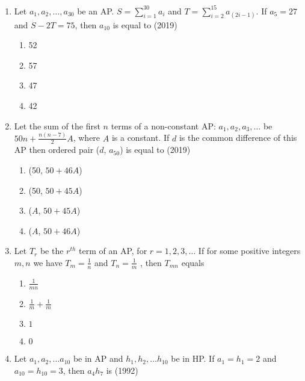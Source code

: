 \begin{enumerate}    [label=\thesubsection.\arabic*, ref=\thesubsection.\theenumi]
\begin{multicols}{4}
\begin{enumerate}
  \item{330}
  \item{165}
  \item{190}
  \end{enumerate}
  \end{multicols}
  \item Let $a_{1}, a_{2}, \dots, a_{30}$ be an AP. $S=\sum_{i=1}^{30}a_{i}$ and $T=\sum_{i=2}^{15}a_{(2i-1)}$. If $a_{5}=27$
	  and $S-2T=75$,  then $a_{10}$ is equal to \null \hfill{(2019)}
\begin{multicols}{4}
\begin{enumerate}    
  \item {52} \item{57}
  \item{47}
  \item{42}
  \end{enumerate}
\end{multicols}
  \item Let the sum of the first $n$ terms of a non-constant AP: $a_{1}, a_{2}, a_{3}, \dots $ be $50n + \frac{n(n-7)}{2}A$,  where $A$ is a constant. If $d$ is the common difference of this AP then ordered pair ($d$, $a_{50}$) is equal to \hfill{(2019)} 
	  \begin{multicols}{4}
\begin{enumerate}    
	\item {(50,  $50+46A$)} \item{(50,  $50+45A$)}
  \item{($A$,  $50+45A$)}
  \item{($A$,  $50+46A$)}
  \end{enumerate}
\end{multicols}
%
\item Let $T_r$ be the $r^{th}$ term of an AP,  for $r=1, 2, 3, \dots$ If for some positive integers $m, n$ we have
$T_m=\frac{1}{n}$ and $T_n=\frac{1}{m}$ , then $T_{mn}$ equals \hfill{}
%
\begin{multicols}{4}
\begin{enumerate}    
\item $\frac{1}{mn}$
\item $\frac{1}{m} + \frac{1}{m}$
\item $1$
\item $0$
\end{enumerate}
\end{multicols}
\item Let ${a_1, a_2, \dots a_{10}}$ be in AP and ${h_1, h_2,  \dots h_{10}}$ be in HP. If ${a_1}={h_1}=2$ and ${a_{10}}={h_{10}}=3$,  then ${a_4h_7}$ is \hfill(1992)

\end{enumerate}
